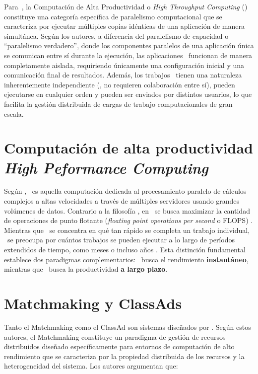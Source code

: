 \noindent
Para~\cite{Morgan2009}, la Computación de Alta Productividad o \textit{High Throughput Computing} (\HTC) constituye una categoría específica de paralelismo computacional que se caracteriza por ejecutar múltiples copias idénticas de una aplicación de manera simultánea. Según los autores, a diferencia del paralelismo de capacidad o ``paralelismo verdadero'', donde los componentes paralelos de una aplicación única se comunican entre sí durante la ejecución, las aplicaciones \HTC~funcionan de manera completamente aislada, requiriendo únicamente una configuración inicial y una comunicación final de resultados. Además, los trabajos \HTC~tienen una naturaleza inherentemente independiente (\ie, no requieren colaboración entre sí), pueden ejecutarse en cualquier orden y pueden ser enviados por distintos usuarios, lo que facilita la gestión distribuida de cargas de trabajo computacionales de gran escala.

\section{Computación de alta productividad \textit{High Peformance Computing} \HPC}

\noindent
Según \cite{SK2023}, \HPC~es aquella computación dedicada al procesamiento paralelo de cálculos complejos a altas velocidades a través de múltiples servidores usando grandes volúmenes de datos. Contrario a la filosofía \HTC, en \HPC~se busca maximizar la cantidad de operaciones de punto flotante (\textit{floating point operations per second} o FLOPS) \citep{HTCondor-what-is-htc}. Mientras que \HPC~se concentra en qué tan rápido se completa un trabajo individual, \HTC~se preocupa por cuántos trabajos se pueden ejecutar a lo largo de períodos extendidos de tiempo, como meses o incluso años \citep{Raman1998}. Esta distinción fundamental establece dos paradigmas complementarios: \HPC~busca el rendimiento \textbf{instantáneo}, mientras que \HTC~busca la productividad \textbf{a largo plazo}.

\section{Matchmaking y ClassAds}
Tanto el Matchmaking como el ClassAd son sistemas diseñados por \cite{Raman1998}. Según estos autores, el Matchmaking constituye un paradigma de gestión de recursos distribuidos diseñado específicamente para entornos de computación de alto rendimiento que se caracteriza por la propiedad distribuida de los recursos y la heterogeneidad del sistema. Los autores argumentan que:

